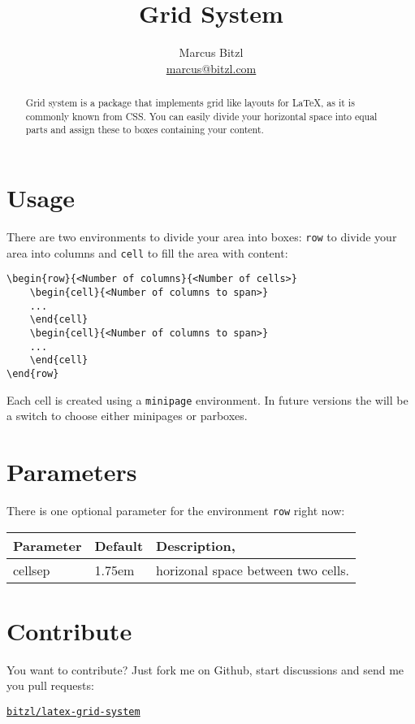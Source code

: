 \documentclass[DIV13]{scrartcl}
\title{Grid System}
\author{Marcus Bitzl\\ \url{marcus@bitzl.com}}
\begin{document}
\maketitle

\begin{abstract}
Grid system is a package that implements grid like layouts for \LaTeX, as it is commonly known from CSS. You can easily divide your horizontal space into equal parts and assign these to boxes containing your content.
\end{abstract}

\section{Usage}
There are two environments to divide your area into boxes: \texttt{row} to divide your area into columns and \texttt{cell} to fill the area with content:

\medskip

\begin{lstlisting}
\begin{row}{<Number of columns}{<Number of cells>}
	\begin{cell}{<Number of columns to span>}
	...
	\end{cell}
	\begin{cell}{<Number of columns to span>}
	...
	\end{cell}
\end{row}
\end{lstlisting}

Each cell is created using a \texttt{minipage} environment. In future versions the will be a switch to choose either minipages or parboxes.

\section{Parameters}
There is one optional parameter for the environment \texttt{row} right now:

\medskip

\begin{tabularx}{\linewidth}{llX}\toprule
\textbf{Parameter} & \textbf{Default} & \textbf{Description},\\ \midrule
cellsep & 1.75em & horizonal space between two cells.\\\bottomrule
\end{tabularx}

\section{Contribute}
You want to contribute? Just fork me on Github, start discussions and send me you pull requests: 
\begin{center}
	\href{https://github.com/bitzl/latex-grid-system}{\tt bitzl/latex-grid-system}
\end{center}
	
\end{document}
